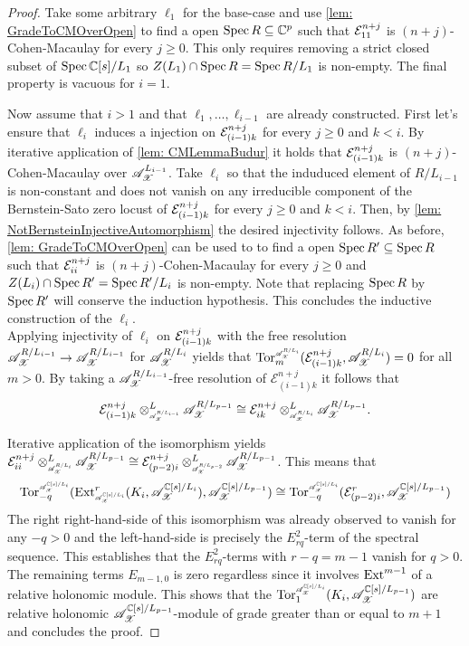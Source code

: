 \begin{proof}
  Take some arbitrary $\ell_1$ for the base-case and use \cref{lem: GradeToCMOverOpen} to find a open $\operatorname{Spec} R \subseteq \mathbb{C}^p$ such that $\mathcal{E}^{n+j}_{11}$  is $(n+j)$-Cohen-Macaulay for every $j\geq 0$.
  This only requires removing a strict closed subset of $\operatorname{Spec} \mathbb{C}[s]/L_1$ so $Z(L_1)\cap \operatorname{Spec} R = \operatorname{Spec} R/L_1$ is non-empty.
  The final property is vacuous for $i=1$.

  Now assume that $i>1$ and that $\ell_1,\ldots, \ell_{i-1}$ are already constructed.
  First let's ensure that $\ell_i$
  induces a injection on $\mathcal{E}^{n+j}_{(i-1)k}$ for every $j\geq 0$ and $k<i$.
  By iterative application of \cref{lem: CMLemmaBudur} it holds that $\mathcal{E}^{n+j}_{(i-1)k }$
  is $(n+j)$-Cohen-Macaulay over $\mathscr{A}_{\mathscr{X}}^{L_{i-1}}$.
  Take $\ell_i$ so that the induduced element of $R/L_{i-1}$ is non-constant and does not vanish on any irreducible component of the Bernstein-Sato zero locust of $\mathcal{E}^{n+j}_{(i-1)k}$ for every $j\geq 0$ and $k<i$.
  Then, by \cref{lem: NotBernsteinInjectiveAutomorphism} the desired injectivity follows.
  As before, \cref{lem: GradeToCMOverOpen} can be used to to find a open $\operatorname{Spec} R' \subseteq \operatorname{Spec} R$ such that $\mathcal{E}^{n+j}_{ii}$  is $(n+j)$-Cohen-Macaulay for every $j\geq 0$ and  $Z(L_i)\cap \operatorname{Spec} R' = \operatorname{Spec} R'/L_i$ is non-empty.
  Note that replacing $\operatorname{Spec} R$ by $\operatorname{Spec} R'$ will conserve the induction hypothesis.
  This concludes the inductive construction of the $\ell_i$.\\


  Applying injectivity of $\ell_i$ on $\mathcal{E}_{(i-1)k}^{n+j}$ with the free resolution $\mathscr{A}_{\mathscr{X}}^{R/L_{i-1}}\to\mathscr{A}_{\mathscr{X}}^{R/L_{i-1}}$ for $\mathscr{A}_{\mathscr{X}}^{R/L_i}$ yields that $\Tr{\A_\X^{R/L_i}}{m}(\E_{(i-1)k}^{n+j}, \A_\X^{R/L_i}) = 0$ for all $m>0$.
  By taking a $\mathscr{A}_{\mathscr{X}}^{R/L_{i-1}}$-free resolution of $\mathcal{E}_{(i-1)k}^{n+j}$ it follows that
  $$\mathcal{E}_{(i-1)k}^{n+j} \otimes^L_{\scaleto{\A_\X^{R/L_{i-1}}}{8pt}} \A_\X^{R/L_{p-1}} \cong  \mathcal{E}_{ik}^{n+j}  \otimes^L_{\scaleto{\A_\X^{R/L_{i}}}{8pt}}\A_\X^{R/L_{p-1}}. $$


  Iterative application of the isomorphism yields $\E_{ii}^{n+j}\otimes^L_{\scaleto{\A_\X^{R/L_{i}}}{8pt}} \A_\X^{R/L_{p-1}} \cong \E_{(p-2)i}^{n+j}\otimes^L_{\scaleto{\A_\X^{R/L_{p-2}}}{8pt}} \A_\X^{R/L_{p-1}}$.
  This means that
  $$\Tr{\A_\X^{\C[s]/L_{i}}}{-q} (\Ex{\A_\X^{\C[s]/L_{i}} }{r} (K_i,\A_\X^{\C[s]/L_{i}}), \A_\X^{\C[s]/L_{p-1}})\cong \Tr{\A_\X^{\C[s]/L_{i}} }{-q}(\E_{(p-2)i}^{r}, \A_\X^{\C[s]/L_{p-1}}) $$
  The right right-hand-side of this isomorphism was already observed to vanish for any $-q > 0$ and the left-hand-side is precisely the $E_{rq}^2$-term of the spectral sequence.
  This establishes that the $E_{rq}^2$-terms with $r-q = m -1$ vanish for $q>0$.
  The remaining terms $E_{m -1,0}$ is zero regardless since it involves $\operatorname{Ext}^{m - 1}$ of a relative holonomic module.
  This shows that the $\Tr{\A_\X^{\C[s]/L_i}}{1}(K_i, \A_\X^{\C[s]/L_{p-1}})$ are relative holonomic $\mathscr{A}_{\mathscr{X}}^{\mathbb{C}[s]/L_{p-1}}$-module of grade greater than or equal to $m+1$ and concludes the proof.
  \end{proof}



